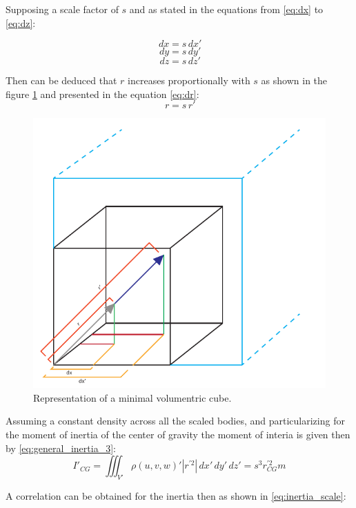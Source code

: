 Supposing a scale factor of $s$ and as stated in the equations from \ref{eq:dx} to \ref{eq:dz}:

\begin{multicols}{3}
  \begin{equation}
  \label{eq:dx}
    \,dx=s \,dx'
  \end{equation}\break
  \begin{equation}
  \label{eq:dy}
    \,dy=s \,dy'
  \end{equation}\break
  \begin{equation}
  \label{eq:dz}
    \,dz=s \,dz'
  \end{equation}\break
\end{multicols}

Then can be deduced that $r$ increases proportionally with $s$ as shown in the figure \ref{fig:dimensional_analysis} and presented in the equation \ref{eq:dr}:
\begin{equation}
  \label{eq:dr}
  \,r=s \,r'
\end{equation}

\begin{figure}[ht!]
  \centering
  \includegraphics[width=0.5\linewidth]{figures/dimensional_analysis.pdf}
  \caption{Representation of a minimal volumentric cube.}
  \label{fig:dimensional_analysis}
\end{figure}

Assuming a constant density across all the scaled bodies, and particularizing for the moment of inertia of the center of gravity the moment of interia is given then by \ref{eq:general_inertia_3}:
\begin{equation}
  \label{eq:general_inertia_3}
  I'_{CG} = \iiint_{V'} \rho(u,v,w)' |r^{'2}| \,dx'\,dy'\,dz' = s^{3} r_{CG}^{'2} m
\end{equation}

A correlation can be obtained for the inertia then as shown in \ref{eq:inertia_scale}:

